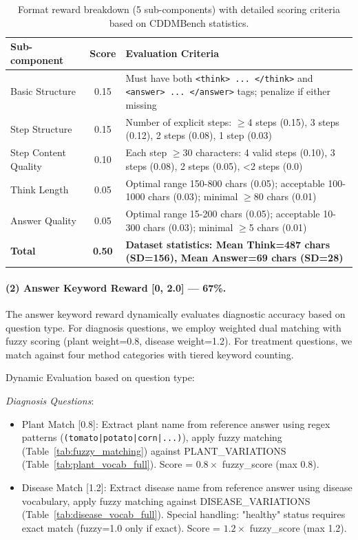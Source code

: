 \documentclass[11pt]{article}
\begin{document}
\begin{table}[t]
\centering
\small
\setlength{\tabcolsep}{6pt}
\begin{tabular}{lcp{11cm}}
\hline
\textbf{Sub-component} & \textbf{Score} & \textbf{Evaluation Criteria} \\
\hline
Basic Structure & 0.15 & Must have both \texttt{<think> ... </think>} and \texttt{<answer> ... </answer>} tags; penalize if either missing \\
Step Structure & 0.15 & Number of explicit steps: $\geq$4 steps (0.15), 3 steps (0.12), 2 steps (0.08), 1 step (0.03) \\
Step Content Quality & 0.10 & Each step $\geq$30 characters: 4 valid steps (0.10), 3 steps (0.08), 2 steps (0.05), <2 steps (0.0) \\
Think Length & 0.05 & Optimal range 150-800 chars (0.05); acceptable 100-1000 chars (0.03); minimal $\geq$80 chars (0.01) \\
Answer Quality & 0.05 & Optimal range 15-200 chars (0.05); acceptable 10-300 chars (0.03); minimal $\geq$5 chars (0.01) \\
\hline
\textbf{Total} & \textbf{0.50} & \textbf{Dataset statistics: Mean Think=487 chars (SD=156), Mean Answer=69 chars (SD=28)} \\
\hline
\end{tabular}
\caption{Format reward breakdown (5 sub-components) with detailed scoring criteria based on CDDMBench statistics.}
\label{tab:format_reward}
\end{table}

\paragraph{(2) Answer Keyword Reward [0, 2.0] — 67\%.}

\noindent The answer keyword reward dynamically evaluates diagnostic accuracy based on question type. For diagnosis questions, we employ weighted dual matching with fuzzy scoring (plant weight=0.8, disease weight=1.2). For treatment questions, we match against four method categories with tiered keyword counting.

\noindent Dynamic Evaluation based on question type:

\noindent\textit{Diagnosis Questions}:
\begin{itemize}
\setlength{\itemsep}{0pt}
\item Plant Match [0.8]: Extract plant name from reference answer using regex patterns (\texttt{(tomato|potato|corn|...)}), apply fuzzy matching (Table~\ref{tab:fuzzy_matching}) against PLANT\_VARIATIONS (Table~\ref{tab:plant_vocab_full}). Score = $0.8 \times$ fuzzy\_score (max 0.8).
\item Disease Match [1.2]: Extract disease name from reference answer using disease vocabulary, apply fuzzy matching against DISEASE\_VARIATIONS (Table~\ref{tab:disease_vocab_full}). Special handling: "healthy" status requires exact match (fuzzy=1.0 only if exact). Score = $1.2 \times$ fuzzy\_score (max 1.2).
\end{itemize}
\end{document}
